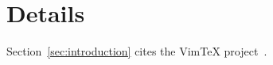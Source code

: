 
\section{Details}
\label{sec:details}

Section~\ref{sec:introduction} cites the VimTeX project~\parencite{vimtex}.
